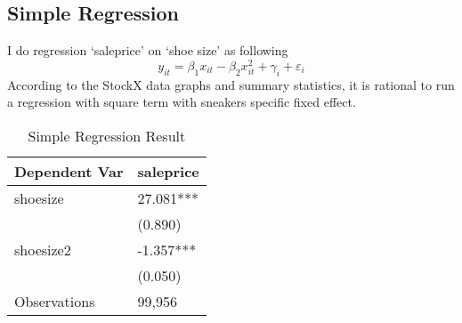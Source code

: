 \documentclass[a4paper]{article}
\theoremstyle{definition}
\theoremstyle{definition}
\theoremstyle{remark}
\begin{document}
\begin{large}
\begin{appendices}
	
	\subsection*{Simple Regression}
	
	I do regression `saleprice' on `shoe size' as following
	\begin{equation}
		y_{it} = \beta_{1}x_{it} - \beta_{2}x_{it}^{2} + \gamma_{i} + \varepsilon_{i}
	\end{equation}
	According to the StockX data graphs and summary statistics, it is rational to run a regression with square term with sneakers specific fixed effect.
	
	\begin{table}[H]
		\centering
		\caption{Simple Regression Result}
		\begin{tabular}{p{}p{}}
			\hline \hline
			Dependent Var & saleprice \\ \hline
			shoesize            &      27.081***\\
			&     (0.890)   \\
			shoesize2           &      -1.357***\\
			&     (0.050)   \\
			Observations        &      99,956   \\
			\hline\hline
		\end{tabular}
	\end{table}
\end{appendices}










	
\end{large}
\end{document}
